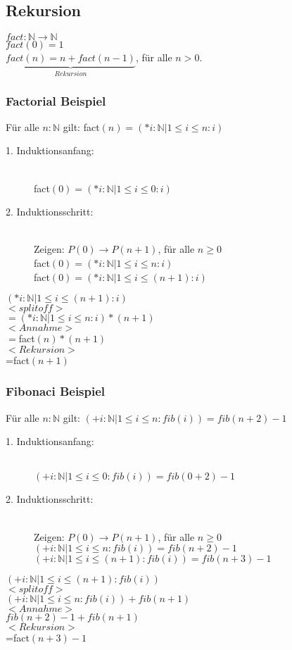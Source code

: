 \documentclass[a4paper,10pt]{article}
\newcommand{\NN}{\mathbb{N}} %
\newcommand{\ra}{\rightarrow}
\begin{document}
\subsection{Rekursion}
$fact: \NN \rightarrow \NN$ \\
$fact(0) = 1$ \\
$\underbrace{fact(n) = n+fact(n-1)}_{Rekursion}$, für alle $n>0$.

\subsubsection{Factorial Beispiel}
Für alle $n:\NN$ gilt: fact$(n)=(*i:\NN | 1 \leq i \leq n : i)$
\begin{description}
	\item[1. Induktionsanfang:] \hfill \\
		fact$(0) = (*i : \NN | 1 \leq i \leq 0 : i)$
	\item[2. Induktionsschritt:] \hfill \\
		Zeigen: $P(0)\ra P(n+1)$, für alle $n \geq 0$ \\
		fact$(0) = (*i : \NN | 1 \leq i \leq n : i)$ \\
		fact$(0) = (*i : \NN | 1 \leq i \leq (n+1) : i)$
\end{description}
$(*i : \NN | 1 \leq i \leq (n+1) : i)$ \\ $<splitoff>$ \\
$=(*i : \NN | 1 \leq i \leq n : i) * (n+1)$ \\ $<Annahme>$ \\
$=$fact$(n)*(n+1)$ \\ $<Rekursion>$ \\
=fact$(n+1)$

\subsubsection{Fibonaci Beispiel}
Für alle $n:\NN$ gilt: $(+ i: \NN | 1 \leq i \leq n : fib(i))=fib(n+2)-1$
\begin{description}
	\item[1. Induktionsanfang:] \hfill \\
		$(+ i: \NN | 1 \leq i \leq 0 : fib(i))=fib(0+2)-1$
	\item[2. Induktionsschritt:] \hfill \\
		Zeigen: $P(0)\ra P(n+1)$, für alle $n \geq 0$ \\
		$(+ i: \NN | 1 \leq i \leq n : fib(i))=fib(n+2)-1$ \\
		$(+ i: \NN | 1 \leq i \leq (n+1) : fib(i))=fib(n+3)-1$
\end{description}
$(+ i: \NN | 1 \leq i \leq (n+1) : fib(i))$ \\ $<splitoff>$ \\
$(+ i: \NN | 1 \leq i \leq n: fib(i)) +fib(n+1) $  \\ $<Annahme>$ \\
$fib(n+2)-1 + fib(n+1) $  \\ $<Rekursion>$ \\
=fact$(n+3)-1$
\end{document}
